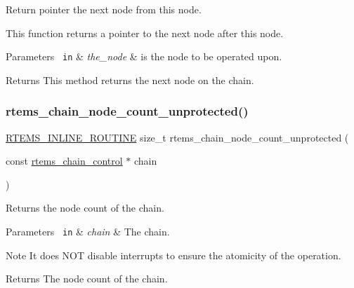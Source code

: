 Return pointer the next node from this node. 

This function returns a pointer to the next node after this node.


\begin{DoxyParams}[1]{Parameters}
\mbox{\texttt{ in}}  & {\em the\+\_\+node} & is the node to be operated upon.\\
\hline
\end{DoxyParams}
\begin{DoxyReturn}{Returns}
This method returns the next node on the chain. 
\end{DoxyReturn}
\mbox{\label{group__ClassicChains_ga33042af3bb3a9b2903ce85d09cc6bf8f}} 
\subsubsection{\texorpdfstring{rtems\_chain\_node\_count\_unprotected()}{rtems\_chain\_node\_count\_unprotected()}}
{\footnotesize\ttfamily \mbox{\hyperlink{group__RTEMSScoreBaseDefs_gac216239df231d5dbd15e3520b0b9313f}{R\+T\+E\+M\+S\+\_\+\+I\+N\+L\+I\+N\+E\+\_\+\+R\+O\+U\+T\+I\+NE}} size\+\_\+t rtems\+\_\+chain\+\_\+node\+\_\+count\+\_\+unprotected (\begin{DoxyParamCaption}\item[{const \mbox{\hyperlink{unionChain__Control}{rtems\+\_\+chain\+\_\+control}} $\ast$}]{chain }\end{DoxyParamCaption})}



Returns the node count of the chain. 


\begin{DoxyParams}[1]{Parameters}
\mbox{\texttt{ in}}  & {\em chain} & The chain.\\
\hline
\end{DoxyParams}
\begin{DoxyNote}{Note}
It does N\+OT disable interrupts to ensure the atomicity of the operation.
\end{DoxyNote}
\begin{DoxyReturn}{Returns}
The node count of the chain. 
\end{DoxyReturn}
\mbox{\label{group__ClassicChains_ga361b3475492fb0bd0a56ee80440367c7}} 
